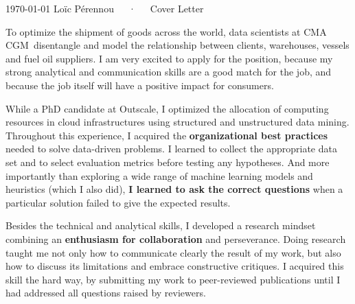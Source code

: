 \documentclass[11pt, a4paper]{awesome-cv}
\newcommand{\company}{CMA CGM}
\begin{document}
\makecvheader[R]

\makecvfooter
  {\today}
  {Loïc Pérennou~~~·~~~Cover Letter}
  {}

\makelettertitle

\begin{cvletter}
  To optimize the shipment of goods across the world, data scientists at \company~disentangle and model the relationship between clients, warehouses, vessels and fuel oil suppliers. 
  I am very excited to apply for the position, because my strong analytical and communication skills are a good match for the job, and because the job itself will have a positive impact for consumers. 

  While a PhD candidate at Outscale, I optimized the allocation of computing resources in cloud infrastructures using structured and unstructured data mining.   
Throughout this experience, I acquired the \textbf{organizational best practices} needed to solve data-driven problems.  
I learned to collect the appropriate data set and to select evaluation metrics before testing any hypotheses. 
And more importantly than exploring a wide range of machine learning models and heuristics (which I also did), \textbf{I learned to ask the correct questions} when a particular solution failed to give the expected results.  

Besides the technical and analytical skills, I developed a research mindset combining an \textbf{enthusiasm for collaboration} and perseverance.  
Doing research taught me not only how to communicate clearly the result of my work, but also how to discuss its limitations and embrace constructive critiques.  
I acquired this skill the hard way, by submitting my work to peer-reviewed publications until I had addressed all questions raised by reviewers. 


\end{cvletter}
\end{document}
